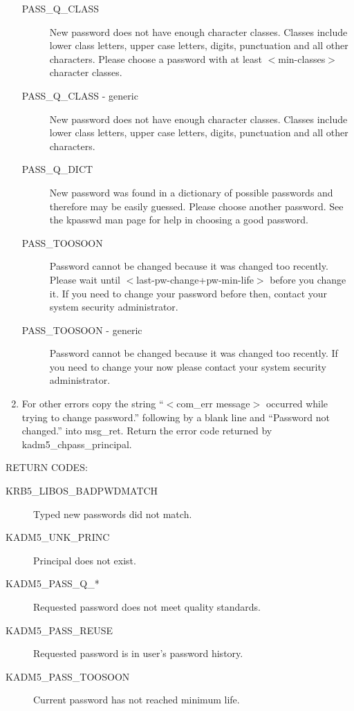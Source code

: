 \begin{enumerate}
\begin{description}
\item[PASS_Q_CLASS]
New password does not have enough character classes. Classes include
lower class letters, upper case letters, digits, punctuation and all
other characters.  Please choose a password with at least
$<$min-classes$>$ character classes.

\item[PASS_Q_CLASS - generic]
New password does not have enough character classes. Classes include
lower class letters, upper case letters, digits, punctuation and all
other characters. 

\item[PASS_Q_DICT] 
New password was found in a dictionary of possible passwords and
therefore may be easily guessed.  Please choose another password. See
the kpasswd man page for help in choosing a good password.

\item[PASS_TOOSOON]
Password cannot be changed because it was changed too recently. Please
wait until $<$last-pw-change+pw-min-life$>$ before you change it. If you
need to change your password before then, contact your system
security administrator.

\item[PASS_TOOSOON - generic]
Password cannot be changed because it was changed too recently. If you
need to change your now please contact your system security
administrator.
\end{description}

\item For other errors copy the string ``$<$com_err message$>$
occurred while trying to change password.'' following by a blank line
and ``Password not changed.'' into msg_ret. Return the error code
returned by kadm5_chpass_principal.
\end{enumerate}


RETURN CODES:

\begin{description}
\item[KRB5_LIBOS_BADPWDMATCH] Typed new passwords did not match.
\item[KADM5_UNK_PRINC] Principal does not exist.
\item[KADM5_PASS_Q_*] Requested password does not meet quality
standards. 
\item[KADM5_PASS_REUSE] Requested password is in user's
password history. 
\item[KADM5_PASS_TOOSOON] Current password has not reached minimum
life. 
\end{description}

